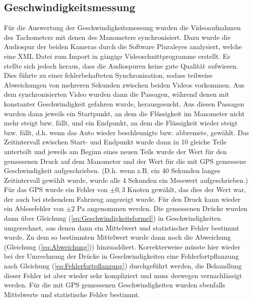 \subsection{Geschwindigkeitsmessung}
Für die Auswertung der Geschwindigkeitsmessung wurden die Videoaufnahmen des Tachometers mit denen des Manometers synchronisiert. Dazu wurde die Audiospur der beiden Kameras durch die Software Pluraleyes analysiert, welche eine XML Datei zum Import in gängige Videoschnittprogramme erstellt. Es stellte sich jedoch heraus, dass die Audiospuren keine gute Qualität aufwiesen. Dies führte zu einer fehlerbehafteten Synchronisation, sodass teilweise Abweichungen von mehreren Sekunden zwischen beiden Videos vorkommen.
Aus dem synchronisierten Video wurden dann die Passagen, während denen mit konstanter Geschwindigkeit gefahren wurde, herausgesucht. Aus diesen Passagen wurden dann jeweils ein Startpunkt, an dem die Flüssigkeit im Manometer nicht mehr steigt bzw. fällt, und ein Endpunkt, an dem die Flüssigkeit wieder steigt bzw. fällt, d.h. wenn das Auto wieder beschleunigte bzw. abbremste, gewählt. Das Zeitintervall zwischen Start- und Endpunkt wurde dann in 10 gleiche Teile unterteilt und jeweils am Beginn eines neuen Teils wurde der Wert für den gemessenen Druck auf dem Manometer und der Wert für die mit GPS gemessene Geschwindigkeit aufgeschrieben. (D.h. wenn z.B. ein 40 Sekunden langes Zeitintervall gewählt wurde, wurde alle 4 Sekunden ein Messwert aufgeschrieben.)
\\
Für das GPS wurde ein Fehler von $\pm 0,3$ Knoten gewählt, das dies der Wert war, der auch bei stehendem Fahrzeug angezeigt wurde. Für den Druck kann wieder ein Ablesefehler von $\pm 2$ Pa angenommen werden. Die gemessenen Drücke wurden dann über Gleichung (\ref{eq:Geschwindigkeitsformel}) in Geschwindigkeiten umgerechnet, aus denen dann ein Mittelwert und statistischer Fehler bestimmt wurde. Zu dem so bestimmten Mittelwert wurde dann noch die Abweichung (Gleichung (\ref{eq:Abweichung})) hinzuaddiert. Korrekterweise müsste hier wieder bei der Umrechnung der Drücke in Geschwindigkeiten eine Fehlerfortpflanzung nach Gleichung (\ref{eq:Fehlerfortpflanzung}) durchgeführt werden, die Behandlung dieser Fehler ist aber wieder sehr kompliziert und muss deswegen vernachlässigt werden. Für die mit GPS gemessenen Geschwindigkeiten wurden ebenfalls Mittelwerte und statistische Fehler bestimmt.
\\
